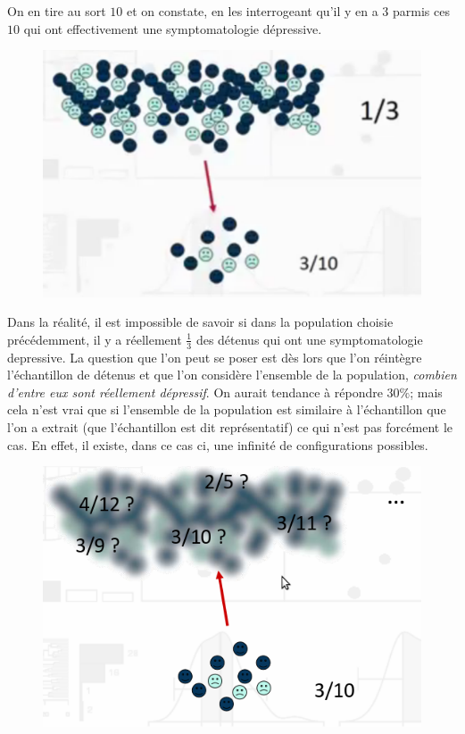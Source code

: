 On en tire au sort $10$ et on constate, en les interrogeant qu'il y en a $3$ parmis ces $10$ qui ont effectivement une symptomatologie dépressive.\newline
\begin{figure}[H]\begin{center}\includegraphics[scale=0.35]{ilu/bp.png}\end{center}\end{figure}
Dans la réalité, il est impossible de savoir si dans la population choisie précédemment, il y a réellement $\frac{1}{3}$ des détenus qui ont une symptomatologie depressive. La question que l'on peut se poser est dès lors que l'on réintègre l'échantillon de détenus et que l'on considère l'ensemble de la population, \textit{combien d'entre eux sont réellement dépressif}.\newline
On aurait tendance à répondre $30\%$; mais cela n'est vrai que si l'ensemble de la population est similaire à l'échantillon que l'on a extrait (que l'échantillon est dit représentatif) ce qui n'est pas forcément le cas.\newline
En effet, il existe, dans ce cas ci, une infinité de configurations possibles.
\begin{figure}[H]\begin{center}\includegraphics[scale=0.35]{ilu/bq.png}\end{center}\end{figure}
